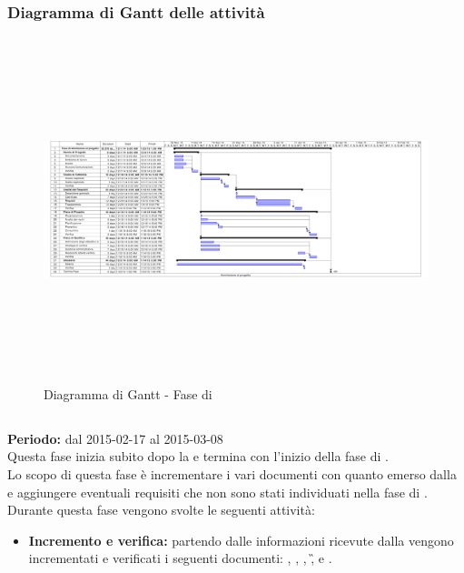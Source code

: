 \subsubsection{Diagramma di Gantt delle attività}
\begin{landscape}
\begin{figure}[h]
\centering
\includegraphics[width=23cm,height=10cm]{../immagini/gantt/ammissioneL.pdf}
\caption{Diagramma di Gantt - Fase di \fAt}\label{fig:ganttFA}
\end{figure}
\end{landscape}
\FloatBarrier
\subsection{\fADt}
\textbf{Periodo:} dal 2015-02-17 al 2015-03-08 \\
Questa fase inizia subito dopo la \RR e termina con l'inizio della fase di \fPA.\\
Lo scopo di questa fase è incrementare i vari documenti con quanto emerso dalla \RR e aggiungere eventuali requisiti che non sono stati individuati nella fase di \fA. \\
Durante questa fase vengono svolte le seguenti attività:
\begin{itemize}
\item \textbf{Incremento e verifica:} partendo dalle informazioni ricevute dalla \RR vengono incrementati e verificati i seguenti documenti: \AR, \NP, \PP, \G, e \PQ.
\end{itemize}
